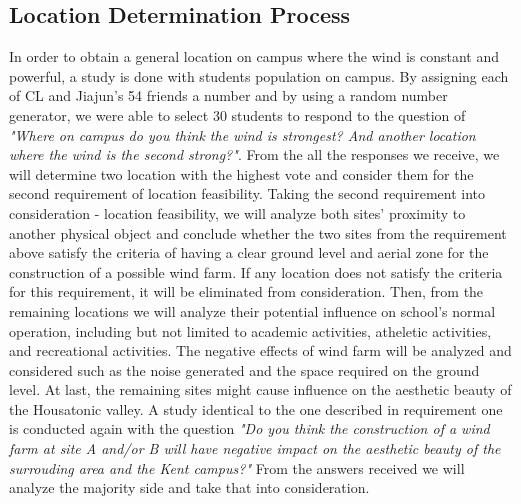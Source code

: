 \documentclass[review]{elsarticle}
\begin{document}
\subsection{Location Determination Process}
In order to obtain a general location on campus where the wind is constant and powerful, a study is done with students population on campus. By assigning each of CL and Jiajun's 54 friends a number and by using a random number generator, we were able to select 30 students to respond to the question of 
\textit{"Where on campus do you think the wind is strongest? And another location where the wind is the second strong?"}. From the all the responses we receive, we will determine two location with the highest vote and consider them for the second requirement of location feasibility.
 Taking the second requirement into consideration - location feasibility, we will analyze both sites' proximity to another physical object and conclude whether the two sites from the requirement above satisfy the criteria of having a clear ground level and aerial zone for the construction of a possible wind farm. If any location does not satisfy the criteria for this requirement, it will be eliminated from consideration.
 Then, from the remaining locations we will analyze their potential influence on school's normal operation, including but not limited to academic activities, atheletic activities, and recreational activities. The negative effects of wind farm will be analyzed and considered such as the noise generated and the space required on the ground level.
 At last, the remaining sites might cause influence on the aesthetic beauty of the Housatonic valley. A study identical to the one described in requirement one is conducted again with the question \textit{"Do you think the construction of a wind farm at site A and/or B will have negative impact on the aesthetic beauty of the surrouding area and the Kent campus?"}
From the answers received we will analyze the majority side and take that into consideration. 
\end{document}
